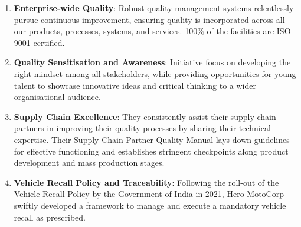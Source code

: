 \begin{enumerate}
	
\item \textbf{Enterprise-wide Quality}: Robust quality management systems relentlessly pursue continuous improvement, ensuring quality is incorporated across all our products, processes, systems, and services.
100\% of the facilities are ISO 9001 certified.
\item \textbf{Quality Sensitisation and Awareness}: Initiative focus
on developing the right mindset among all stakeholders, while
providing opportunities for young talent to showcase innovative
ideas and critical thinking to a wider organisational audience.
\item \textbf{Supply Chain Excellence}: They consistently assist their supply chain partners in improving their quality processes by sharing their technical expertise. Their Supply Chain Partner Quality Manual lays down guidelines for effective functioning and establishes stringent checkpoints along	product development and mass production stages.
\item \textbf{Vehicle Recall Policy and Traceability}: Following the roll-out of the Vehicle Recall Policy by the
Government of India in 2021, Hero MotoCorp swiftly
developed a framework to manage and execute a mandatory
vehicle recall as prescribed.

\end{enumerate}